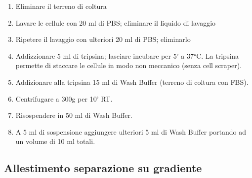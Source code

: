 \begin{enumerate}

    \item Eliminare il terreno di coltura

    \item Lavare le cellule con 20 ml di PBS; eliminare il liquido di lavaggio

    \item Ripetere il lavaggio con ulteriori 20 ml di PBS; eliminarlo

    \item Addizzionare 5 ml di tripsina; lasciare incubare per 5' a 37°C.
    La tripsina permette di staccare le cellule in modo non meccanico (senza cell scraper).

    \item Addizionare alla tripsina 15 ml di Wash Buffer (terreno di coltura con FBS).

    \item Centrifugare a 300g per 10' RT.

    \item Risospendere in 50 ml di Wash Buffer.

    \item A 5 ml di sospensione aggiungere ulteriori 5 ml di Wash Buffer portando
    ad un volume di 10 ml totali.

\end{enumerate}

\subsection{Allestimento separazione su gradiente}

